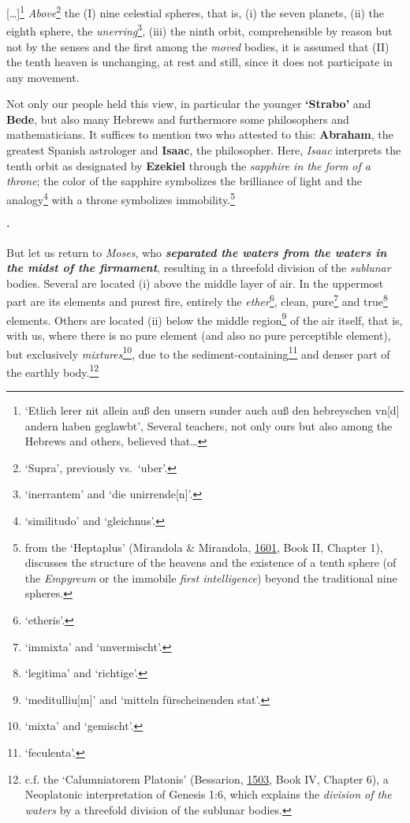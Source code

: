 \documentclass[
]{article}
\begin{document}
{[}\ldots{]}\footnote{`Etlich lerer nit allein auß den unsern sunder
  auch auß den hebreyschen vn{[}d{]} andern haben geglawbt', Several
  teachers, not only ours but also among the Hebrews and others,
  believed that\ldots{}} \emph{Above}\footnote{`Supra', previously
  vs.~`uber'.} the (I) nine celestial spheres, that is, (i) the seven
planets, (ii) the eighth sphere, the \emph{unerring}\footnote{`inerrantem'
  and `die unirrende{[}n{]}'.}, (iii) the ninth orbit, comprehensible by
reason but not by the senses and the first among the \emph{moved}
bodies, it is assumed that (II) the tenth heaven is unchanging, at rest
and still, since it does not participate in any movement.

Not only our people held this view, in particular the younger
\textbf{`Strabo'} and \textbf{Bede}, but also many Hebrews and
furthermore some philosophers and mathematicians. It suffices to mention
two who attested to this: \textbf{Abraham}, the greatest Spanish
astrologer and \textbf{Isaac}, the philosopher. Here, \emph{Isaac}
interprets the tenth orbit as designated by \textbf{Ezekiel} through the
\emph{sapphire in the form of a throne}; the color of the sapphire
symbolizes the brilliance of light and the analogy\footnote{`similitudo'
  and `gleichnus'.} with a throne symbolizes immobility.\footnote{from
  the `Heptaplus' (Mirandola \& Mirandola,
  \href{https://doi.org/10.3931/e-rara-61217}{1601}, Book II, Chapter
  1), discusses the structure of the heavens and the existence of a
  tenth sphere (of the \emph{Empyreum} or the immobile \emph{first
  intelligence}) beyond the traditional nine spheres.}

⋅

But let us return to \emph{Moses}, who \textbf{\emph{separated the
waters from the waters in the midst of the firmament}}, resulting in a
threefold division of the \emph{sublunar} bodies. Several are located
(i) above the middle layer of air. In the uppermost part are its
elements and purest fire, entirely the \emph{ether}\footnote{`etheris'.},
clean, pure\footnote{`immixta' and `unvermischt'.} and true\footnote{`legitima'
  and `richtige'.} elements. Others are located (ii) below the middle
region\footnote{`meditulliu{[}m{]}' and `mitteln fürscheinenden stat'.}
of the air itself, that is, with us, where there is no pure element (and
also no pure perceptible element), but exclusively
\emph{mixtures}\footnote{`mixta' and `gemischt'.}, due to the
sediment-containing\footnote{`feculenta'.} and denser part of the
earthly body.\footnote{c.f. the `Calumniatorem Platonis' (Bessarion,
  \href{https://books.google.com/books?id=gPJCAAAAcAAJ}{1503}, Book IV,
  Chapter 6), a Neoplatonic interpretation of Genesis 1:6, which
  explains the \emph{division of the waters} by a threefold division of
  the sublunar bodies.}
\end{document}
